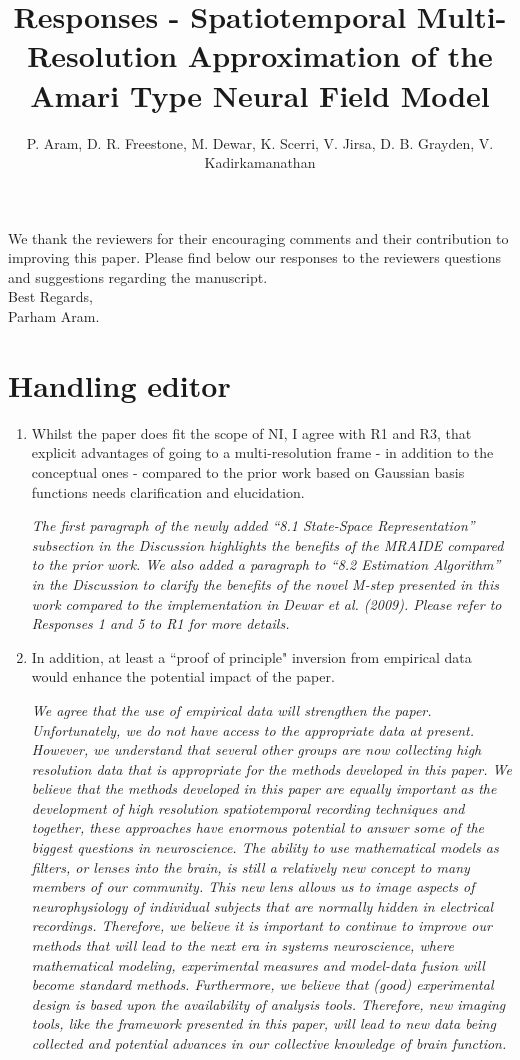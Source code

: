 \documentclass{article}
\title{Responses - Spatiotemporal Multi-Resolution Approximation of the Amari Type Neural Field Model}
\author{ P. Aram, D. R. Freestone, M. Dewar, K. Scerri, V. Jirsa, D. B. Grayden, V. Kadirkamanathan}
\begin{document}
    \maketitle

    We thank the reviewers for their encouraging comments and their contribution to improving this paper. Please find below our responses to the reviewers questions and suggestions regarding the manuscript. 
\\

Best Regards,
\\

Parham Aram.

\section{Handling editor}
\begin{enumerate}
\item Whilst the paper does fit the scope of NI, I agree with R1 and R3, that explicit advantages of going to a multi-resolution frame - in addition to the conceptual ones - compared to the prior work based on Gaussian basis functions needs clarification and elucidation.
 
\emph{The first paragraph of the newly added ``8.1 State-Space Representation'' subsection in the Discussion  highlights the benefits of the MRAIDE compared to the prior work. We also added a paragraph to ``8.2 Estimation Algorithm'' in the Discussion to clarify the benefits of the novel M-step presented in this work compared to the implementation in Dewar et al. (2009). Please refer to Responses 1 and 5 to R1 for more details.}

\item  In addition, at least a ``proof of principle" inversion from empirical data would enhance the potential impact of the paper. 

\emph{We agree that the use of empirical data will strengthen the paper. Unfortunately, we do not have access to the appropriate data at present. However, we understand that several other groups are now collecting high resolution data that is appropriate for the methods developed in this paper. We believe that the methods developed in this paper are equally important as the development of high  resolution spatiotemporal recording techniques and together, these approaches have enormous potential to answer some of the biggest questions in neuroscience. The ability to use mathematical models as filters, or lenses into the brain, is still a relatively new concept to many members of our community. This new lens allows us to image aspects of neurophysiology of individual subjects that are normally hidden in electrical recordings. Therefore, we believe it is important to continue to improve our methods that will lead to the next era in systems neuroscience, where mathematical modeling, experimental measures and model-data fusion will become standard methods. Furthermore, we believe that (good) experimental design is based upon the availability of analysis tools. Therefore, new imaging tools, like the framework presented in this paper, will lead to new data being collected and potential advances in our collective knowledge of brain function.}
	

\end{enumerate}
\end{document}
